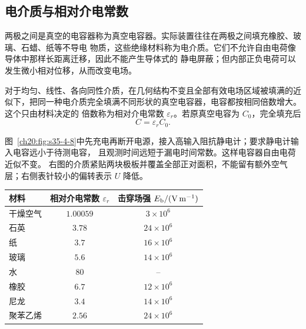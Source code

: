 {\subsection{电介质与相对介电常数}


两极之间是真空的电容器称为真空电容器。实际装置往往在两极之间填充橡胶、玻璃、石蜡、纸等不导电
物质，这些绝缘材料称为电介质。它们不允许自由电荷像导体中那样长距离迁移，因此不能产生导体式的
静电屏蔽；但内部正负电荷可以发生微小相对位移，从而改变电场。

对于均匀、线性、各向同性介质，在几何结构不变且全部有效电场区域被填满的近似下，把同一种电介质完全填满不同形状的真空电容器，电容都按相同倍数增大。这个只由材料决定的
倍数称为相对介电常数 $\varepsilon_r$。若原真空电容为 $C_0$，完全填充后
\begin{equation}
  \boxed{C=\varepsilon_rC_0}.
\end{equation}

图~\ref{ch20:fig:s35-4-8}中先充电再断开电源，接入高输入阻抗静电计；要求静电计输入电容远小于待测电容，
且观测时间远短于漏电时间常数。这样电容器自由电荷近似不变。
右图的介质紧贴两块极板并覆盖全部正对面积，不能留有额外空气层；右侧表针较小的偏转表示 $U$ 降低。
\par\noindent\begin{minipage}{\linewidth}
\dielectricMeterFigure
{}\label{ch20:fig:s35-4-8}
\end{minipage}\par\medskip

\begin{table}[htbp]
\centering
\small
{}\label{ch20:tab:s35-4-1}
\begin{tabular}{lcc}
\toprule
材料 & 相对介电常数 $\varepsilon_r$ & 击穿场强 $E_{\rm b}/(\mathrm{V\,m^{-1}})$\\
\midrule
干燥空气 & $1.00059$ & $3\times10^6$\\
石英 & $3.78$ & $24\times10^6$\\
纸 & $3.7$ & $16\times10^6$\\
玻璃 & $5.6$ & $14\times10^6$\\
水 & $80$ & --\\
橡胶 & $6.7$ & $12\times10^6$\\
尼龙 & $3.4$ & $14\times10^6$\\
聚苯乙烯 & $2.56$ & $24\times10^6$\\
\bottomrule
\end{tabular}
\end{table}

}
